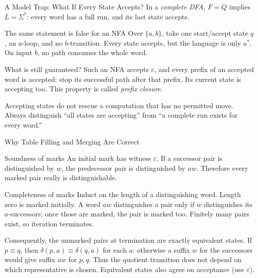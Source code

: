 \documentclass[10pt]{beamer}
\begin{document}
\begin{frame}{A Model Trap: What If Every State Accepts?}
  \small
  In a \emph{complete DFA}, $F=Q$ implies $L=\Sigma^*$: every word has a
  full run, and its last state accepts.
  \pause
  \begin{exampleblock}{The same statement is false for an NFA}
    Over $\{a,b\}$, take one start/accept state $q$, an $a$-loop, and no
    $b$-transition. Every state accepts, but the language is only $a^*$.
    On input $b$, no path consumes the whole word.
  \end{exampleblock}
  \pause
  \begin{block}{What is still guaranteed?}
    Such an NFA accepts $\varepsilon$, and every prefix of an accepted word
    is accepted: stop its successful path after that prefix. Its current
    state is accepting too. This property is called \emph{prefix closure}.
  \end{block}
  Accepting states do not rescue a computation that has no permitted move.
  Always distinguish ``all states are accepting'' from ``a complete run
  exists for every word.''
\end{frame}

\begin{frame}{Why Table Filling and Merging Are Correct}
  \small
  \begin{block}{Soundness of marks}
    An initial mark has witness $\varepsilon$. If a successor pair is
    distinguished by $w$, the predecessor pair is distinguished by $aw$.
    Therefore every marked pair really is distinguishable.
  \end{block}
  \pause
  \begin{block}{Completeness of marks}
    Induct on the length of a distinguishing word. Length zero is marked
    initially. A word $aw$ distinguishes a pair only if $w$ distinguishes
    its $a$-successors; once those are marked, the pair is marked too.
    Finitely many pairs exist, so iteration terminates.
  \end{block}
  \pause
  Consequently, the unmarked pairs at termination are exactly equivalent
  states. If $p\equiv q$, then $\delta(p,a)\equiv\delta(q,a)$ for each $a$:
  otherwise a suffix $w$ for the successors would give suffix $aw$ for $p,q$.
  Thus the quotient transition does not depend on which representative is
  chosen. Equivalent states also agree on acceptance (use $\varepsilon$).
\end{frame}
\end{document}
